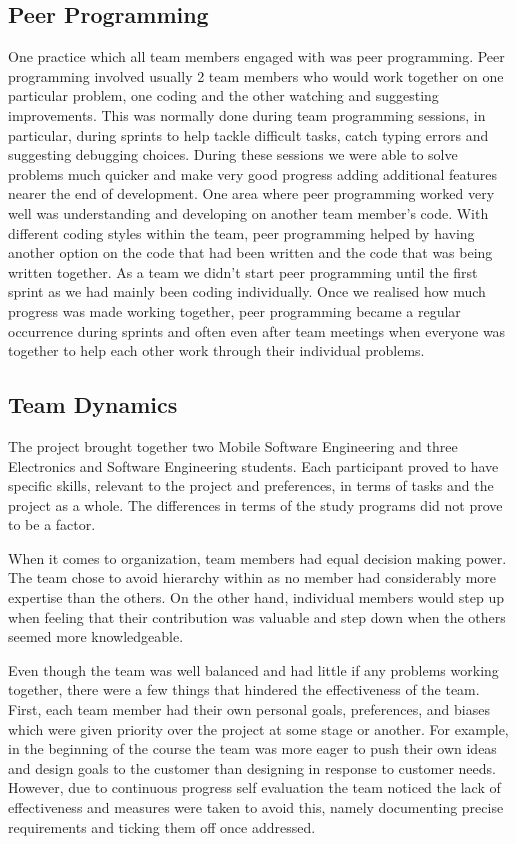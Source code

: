 \documentclass{l3proj}
\begin{document}
\subsection{Peer Programming}
One practice which all team members engaged with was peer programming. Peer programming involved usually 2 team members who would work together on one particular problem, one coding and the other watching and suggesting improvements. This was normally done during team programming sessions, in particular, during sprints to help tackle difficult tasks, catch typing errors and suggesting debugging choices. During these sessions we were able to solve problems much quicker and make very good progress adding additional features nearer the end of development. One area where peer programming worked very well was understanding and developing on another team member’s code. With different coding styles within the team, peer programming helped by having another option on the code that had been written and the code that was being written together. 
As a team we didn’t start peer programming until the first sprint as we had mainly been coding individually. Once we realised how much progress was made working together, peer programming became a regular occurrence during sprints and often even after team meetings when everyone was together to help each other work through their individual problems.


\subsection{Team Dynamics}
The project brought together two Mobile Software Engineering and three Electronics and Software Engineering students. 
Each participant proved to have specific skills, relevant to the project and preferences, in terms of tasks and the project as a whole. 
The differences in terms of the study programs did not prove to be a factor.
 
When it comes to organization, team members had equal decision making power. 
The team chose to avoid hierarchy within as no member had considerably more expertise than the others. 
On the other hand, individual members would step up when feeling that their contribution was valuable and step down when the others seemed more knowledgeable. 

Even though the team was well balanced and had little if any problems working together, there were a few things that hindered the effectiveness of the team. 
First, each team member had their own personal goals, preferences, 
and biases which were given priority over the project at some stage or another. 
For example, in the beginning of the course the team was more eager to push their own ideas and design goals to the customer than designing in response to customer needs. 
However, due to continuous progress self evaluation the team noticed the lack of effectiveness and measures were taken to avoid this, 
namely documenting precise requirements and ticking them off once addressed. 
\end{document}
